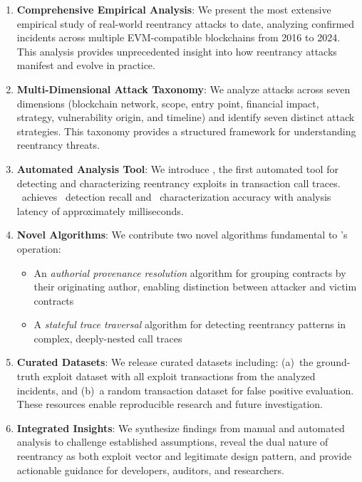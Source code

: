 \begin{enumerate}
    \item \textbf{Comprehensive Empirical Analysis}: We present the most extensive empirical study of real-world reentrancy attacks to date, analyzing  confirmed incidents across multiple EVM-compatible blockchains from 2016 to 2024. This analysis provides unprecedented insight into how reentrancy attacks manifest and evolve in practice.

    \item \textbf{Multi-Dimensional Attack Taxonomy}: We analyze attacks across seven dimensions (blockchain network, scope, entry point, financial impact, strategy, vulnerability origin, and timeline) and identify seven distinct attack strategies. This taxonomy provides a structured framework for understanding reentrancy threats.

    \item \textbf{Automated Analysis Tool}: We introduce \ToolName, the first automated tool for detecting and characterizing reentrancy exploits in transaction call traces. \ToolName\ achieves \FirstRecall\ detection recall and \FirstCategorizationRecall\ characterization accuracy with analysis latency of approximately  milliseconds.

    \item \textbf{Novel Algorithms}: We contribute two novel algorithms fundamental to \ToolName's operation:
    \begin{itemize}
        \item An \textit{authorial provenance resolution} algorithm for grouping contracts by their originating author, enabling distinction between attacker and victim contracts
        \item A \textit{stateful trace traversal} algorithm for detecting reentrancy patterns in complex, deeply-nested call traces
    \end{itemize}

    \item \textbf{Curated Datasets}: We release curated datasets including: (a)~the ground-truth exploit dataset with all  exploit transactions from the analyzed incidents, and (b)~a random transaction dataset for false positive evaluation. These resources enable reproducible research and future investigation.

    \item \textbf{Integrated Insights}: We synthesize findings from manual and automated analysis to challenge established assumptions, reveal the dual nature of reentrancy as both exploit vector and legitimate design pattern, and provide actionable guidance for developers, auditors, and researchers.
\end{enumerate}

